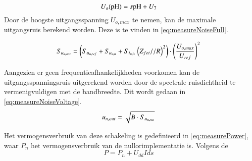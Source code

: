 \begin{equation}
    U_o(\mathrm{pH}) = s\mathrm{pH} + U_7
    \label{eq:measureOutVoltage}
\end{equation}
Door de hoogste uitgangsspanning $U_{o,max}$ te nemen, kan de maximale uitgangsruis berekend worden. Deze is te vinden in \autoref{eq:measureNoiseFull}.

\begin{equation}\label{eq:measureNoiseFull}
    S_{u_{{n,out}}} = \left(S_{u_{{n,ref}}} + S_{u_{{n,n}}} + S_{i_{{n,in}}}\left(Z_{fet} // R\right)^2\right) \cdot \left(\frac{U_{o,max}}{U_{ref}}\right)^2
    \tagaddtext{[\si{\volt\squared\per\hertz}]}
\end{equation}

Aangezien er geen frequentieafhankelijkheden voorkomen kan de uitgangsspanningsruis uitgerekend worden door de spectrale ruisdichtheid te vermenigvuldigen met de bandbreedte. Dit wordt gedaan in \autoref{eq:measureNoiseVoltage}.
\begin{equation}\label{eq:measureNoiseVoltage}
    u_{n,out} = \sqrt{B \cdot S_{u_{{n,out}}}}
    \tagaddtext{[\si{\volt}]}
\end{equation}

Het vermogensverbruik van deze schakeling is gedefinieerd in \autoref{eq:measurePower}, waar $P_n$ het vermogensverbruik van de nullorimplementatie is. Volgens de 
\begin{equation}\label{eq:measurePower}
    P = P_n + U_{dd}I{ds}
\end{equation}
